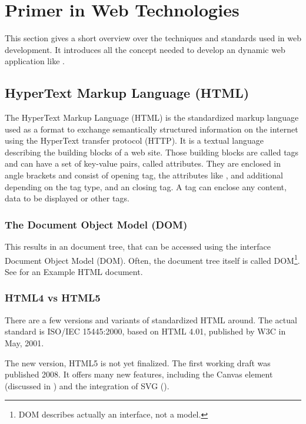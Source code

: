 \section{Primer in Web Technologies}

This section gives a short overview over the techniques and standards used in web development.
It introduces all the concept needed to develop an dynamic web application like \spl.



\subsection{HyperText Markup Language (HTML)}
The HyperText Markup Language (HTML) is the standardized markup language used as a format to exchange semantically structured information on the internet using the HyperText transfer protocol (HTTP).
It is a textual language describing the building blocks of a web site.
Those building blocks are called tags and can have a set of key-value pairs, called attributes.
They are enclosed in angle brackets and consist of opening tag, the attributes like ,  and additional depending on the tag type, and an closing tag.
A tag can enclose any content, data to be displayed or other tags.


\subsubsection{The Document Object Model (DOM)}
This results in an document tree, that can be accessed using the interface Document Object Model (DOM).
Often, the document tree itself is called DOM\footnote{DOM describes actually an interface, not a model.}.
See  for an Example HTML document.

\subsubsection{HTML4 vs HTML5}

There are a few versions and variants of standardized HTML around. The actual standard is ISO/IEC 15445:2000\cite{isohtml}, based on HTML 4.01, published by W3C in May, 2001.

The new version, HTML5 is not yet finalized.
The first working draft was published 2008\cite{html5_draft}.
It offers many new features, including the Canvas element (discussed in ) and the integration of SVG ().


